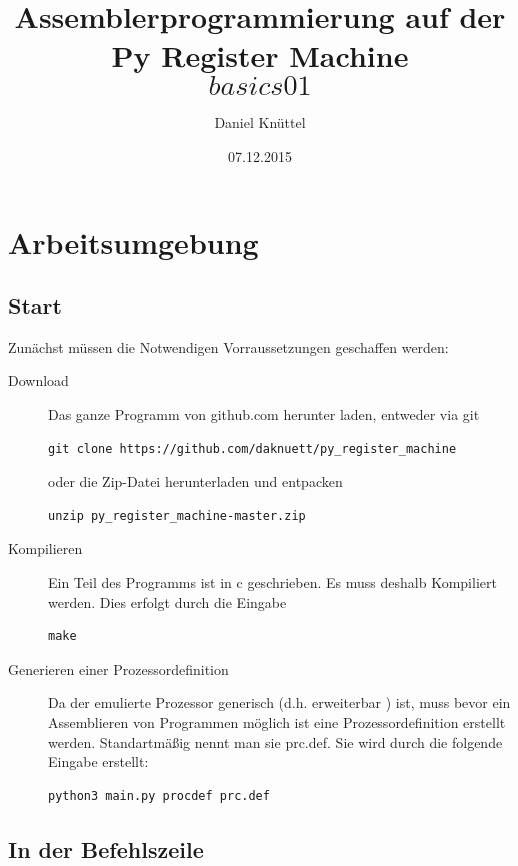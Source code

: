 \documentclass[a4paper,12pt,oneside]{scrreprt}
\title{ Assemblerprogrammierung auf der Py Register Machine \[basics 01\]}
\author{Daniel Knüttel}
\date{07.12.2015}
\begin{document}
\maketitle
\tableofcontents

\chapter{Arbeitsumgebung}

\section{Start}

Zunächst müssen die Notwendigen Vorraussetzungen geschaffen werden:

\begin{description}

\item[Download] Das ganze Programm von github.com herunter laden, entweder via git   

\begin{lstlisting}
git clone https://github.com/daknuett/py_register_machine
\end{lstlisting}

oder die Zip-Datei herunterladen und entpacken

\begin{lstlisting}
unzip py_register_machine-master.zip
\end{lstlisting}

\item[Kompilieren] Ein Teil des Programms ist in c geschrieben. Es muss deshalb Kompiliert werden. Dies erfolgt durch die Eingabe

\begin{lstlisting}
make
\end{lstlisting}


\item[Generieren einer Prozessordefinition] Da der emulierte Prozessor generisch (d.h. erweiterbar )  ist, muss
bevor ein Assemblieren von Programmen möglich ist eine Prozessordefinition erstellt werden. Standartmäßig nennt man sie prc.def.  
Sie wird durch die folgende Eingabe erstellt:

\begin{lstlisting}
python3 main.py procdef prc.def
\end{lstlisting}

\end{description}

\section{In der Befehlszeile}
\end{document}
